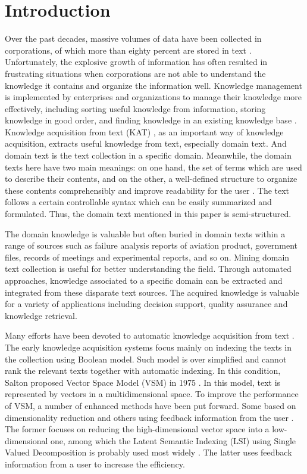 \documentclass{elsart}
\begin{document}
\section{Introduction}
\label{sec:introduction}

Over the past decades, massive volumes of data have been collected in
corporations, of which more than eighty percent are stored in
text \cite{Mitchell2003}. Unfortunately, the explosive growth of
information has often resulted in frustrating situations when
corporations are not able to understand the knowledge it contains 
and organize the information well. Knowledge management is
implemented by enterprises and organizations to manage their knowledge
more effectively, including sorting useful knowledge from information, storing
knowledge in good order, and finding knowledge in an existing
knowledge base \cite{turban2001dss}. Knowledge acquisition from text
(KAT) , as an important way of knowledge acquisition, 
extracts useful knowledge from
text, especially domain text. And domain text is the text collection in a specific domain. Meanwhile, the domain texts here have two
main meanings: on one hand, the set of terms which are used to
describe their contents, and on the other, a well-defined structure to
organize these contents comprehensibly and improve readability for the
user \cite{Campos2004}. The text follows a certain controllable syntax
which can be easily summarized and formulated. Thus, the domain text
mentioned in this paper is semi-structured. 

The domain knowledge is valuable but often buried in domain texts
within a range of sources such as failure analysis reports of aviation
product, government files, records of meetings and experimental
reports, and so on. Mining domain text collection is useful for better understanding
the field. Through automated approaches, knowledge
associated to a specific domain can be extracted and integrated from
these disparate text sources. The acquired knowledge is valuable for a variety of applications including decision support, quality assurance and knowledge retrieval.

Many efforts have been devoted to automatic knowledge
acquisition from text \cite{salton1975vsm,361220,215383,Tai2002,130346} . The early knowledge acquisition systems focus mainly on indexing the
texts in the collection using Boolean model. Such model is over
simplified and cannot rank the relevant texts together with automatic
indexing. In this condition, Salton proposed Vector Space Model (VSM) in 1975 \cite{salton1975vsm,361220}. In this model, text is represented by vectors in a multidimensional space. To improve the performance of VSM, a number of enhanced methods have been put forward. Some based on dimensionality reduction and others using feedback information from the user \cite{Tai2002}. The former focuses on reducing the high-dimensional vector space into a low-dimensional one, among which the Latent Semantic Indexing (LSI) using Single Valued Decomposition is probably used most widely \cite{130346}. The latter uses feedback information from a user to increase the efficiency.
\end{document}
